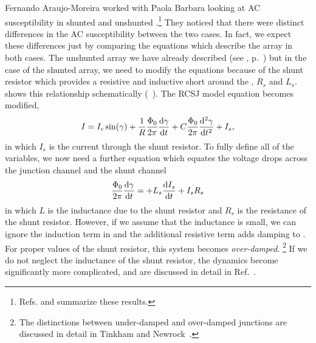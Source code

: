 Fernando Araujo-Moreira worked with Paola Barbara looking at AC
susceptibility in shunted and unshunted 
\jjas.\footnote{Refs.
\cite{araujo_prl_78_4625_1997} and \cite{barbara_prb_60_7489_1999}
summarize these results.}
They noticed that there were distinct differences in the AC 
susceptibility between the two cases. In fact, we expect these
differences just by comparing the equations which describe the 
array in both cases. The unshunted array we have already described
(see , p.~\pageref{eqn:RCSJ}) 
but in the case of the shunted array, 
we need to modify the equations because of the shunt resistor
which provides a resistive and inductive short around the 
\jjnoun, $R_{s}$ and $L_s$. 
shows this relationship schematically 
(\cf\ ).
The RCSJ model equation becomes modified,
%
\begin{equation}
\label{eqn:RCSJ_shunt_current}
I = I_c \sin(\gamma) + {1\over R} {\Phi_0 \over 2 \pi}{\mathrm{d}\gamma \over \mathrm{d} t}
+ C {\Phi_0 \over 2 \pi} {\mathrm{d}^2\gamma \over \mathrm{d} t^2} + I_s,
\end{equation}
%
in which $I_s$ is the current through the shunt resistor. To fully define
all of the variables, we now need a further equation which equates the
voltage drops across the junction channel and the shunt channel
%
\begin{equation}
\label{eqn:RCSJ_shunt_volt}
{\ensuremath{\Phi_0}\over 2 \pi} {\ensuremath{\mathrm{d}}\gamma \over \ensuremath{\mathrm{d}}t} = 
+  L_s {\mathrm{d} I_s \over \mathrm{d} t} 
+  I_s R_s 
\end{equation}
%
in which $L$ is the inductance due to the shunt resistor and 
$R_s$ is the resistance of the shunt resistor. However,
if we assume that the inductance is small, we can ignore the induction
term in  and the additional resistive term
adds damping to . For proper values 
of the shunt resistor, this system becomes \emph{over-damped}.%
\footnote{The distinctions between under-damped and over-damped junctions are discussed
in detail in Tinkham \cite{tinkham} and Newrock 
\etal\,\cite{newrock_ssp_54_263_2000}.}
If we do not neglect the inductance of the shunt resistor, the dynamics
become significantly more complicated, and are discussed in 
detail in Ref.~\cite{cawthorne_jap_84_1126_1998}. 

